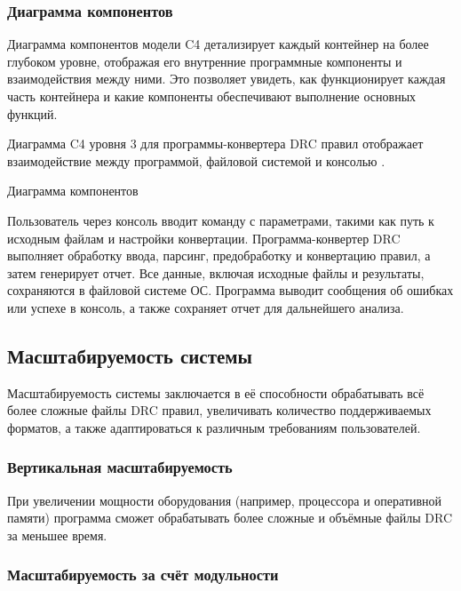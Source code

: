 \subsubsection{Диаграмма компонентов}

Диаграмма компонентов модели C4 детализирует
каждый контейнер на более глубоком уровне,
отображая его внутренние программные компоненты и взаимодействия между ними.
Это позволяет увидеть, как функционирует каждая часть контейнера
и какие компоненты обеспечивают выполнение основных функций.

Диаграмма C4 уровня 3 для программы-конвертера DRC правил
отображает взаимодействие между программой,
файловой системой и консолью .

\begin{image}
	\caption{Диаграмма компонентов}
	\label{fig:c4:components}
\end{image}

Пользователь через консоль вводит команду с параметрами,
такими как путь к исходным файлам и настройки конвертации.
Программа-конвертер DRC выполняет обработку ввода, парсинг,
предобработку и конвертацию правил, а затем генерирует отчет.
Все данные, включая исходные файлы и результаты,
сохраняются в файловой системе ОС.
Программа выводит сообщения об ошибках или успехе в консоль,
а также сохраняет отчет для дальнейшего анализа.

\subsection{Масштабируемость системы}

Масштабируемость системы заключается в её способности обрабатывать
всё более сложные файлы DRC правил,
увеличивать количество поддерживаемых форматов,
а также адаптироваться к различным требованиям пользователей.

\subsubsection{Вертикальная масштабируемость}

При увеличении мощности оборудования
(например, процессора и оперативной памяти)
программа сможет обрабатывать более сложные
и объёмные файлы DRC за меньшее время.
  
\subsubsection{Масштабируемость за счёт модульности}

